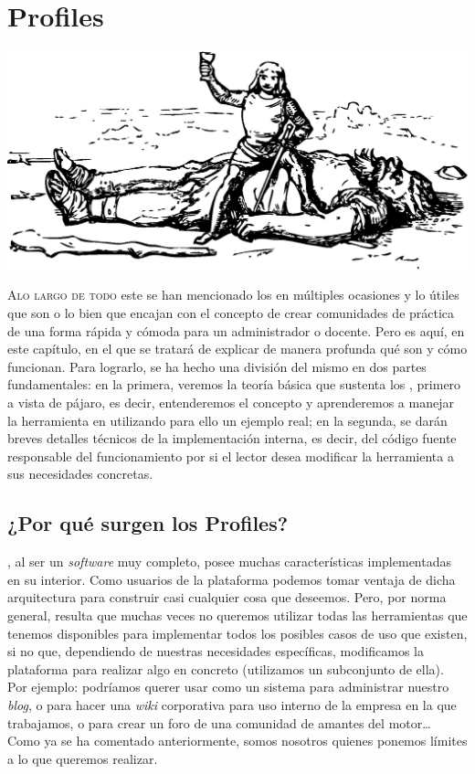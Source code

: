 \chapter{Profiles} 
\label{chapter:profiles}

\begin{center}
\includegraphics[scale=0.4]{../graphics/johnny_automatic_Jack_victorious.eps}
\end{center}

\lettrine{A}{lo largo de todo} este \pfc{} se han mencionado los \profiles{} en múltiples ocasiones y lo útiles que son o lo bien que encajan con el concepto de crear comunidades de práctica de una forma rápida y cómoda para un administrador o docente. Pero es aquí, en este capítulo, en el que se tratará de explicar de manera profunda qué son y cómo funcionan. Para lograrlo, se ha hecho una división del mismo en dos partes fundamentales: en la primera, veremos la teoría básica que sustenta los \profiles{}, primero a vista de pájaro, es decir, entenderemos el concepto y aprenderemos a manejar la herramienta en \tiki{} utilizando para ello un ejemplo real; en la segunda, se darán breves detalles técnicos de la implementación interna, es decir, del código fuente responsable del funcionamiento por si el lector desea modificar la herramienta a sus necesidades concretas. 

\section{¿Por qué surgen los Profiles?}

\tiki{}, al ser un \textit{software} muy completo, posee muchas características implementadas en su interior. Como usuarios de la plataforma podemos tomar ventaja de dicha arquitectura para construir casi cualquier cosa que deseemos. Pero, por norma general, resulta que muchas veces no queremos utilizar todas las herramientas que tenemos disponibles para implementar todos los posibles casos de uso que existen, si no que, dependiendo de nuestras necesidades específicas, modificamos la plataforma para realizar algo en concreto (utilizamos un subconjunto de ella). Por ejemplo: podríamos querer usar \tiki{} como un sistema para administrar nuestro \textit{blog}, o para hacer una \textit{wiki} corporativa para uso interno de la empresa en la que trabajamos, o para crear un foro de una comunidad de amantes del motor\ldots{} Como ya se ha comentado anteriormente, somos nosotros quienes ponemos límites a lo que queremos realizar.

